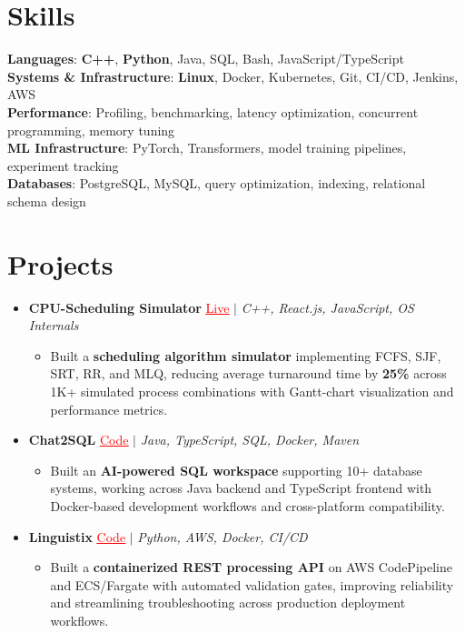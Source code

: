 \documentclass[letterpaper,10pt]{article}
\newcommand{\resumeItem}[1]{\item\small{{#1 \vspace{-2pt}}}}
\newcommand{\resumeProjectHeading}[1]{\item \small #1 \vspace{-2pt}}
\newcommand{\resumeSubHeadingListStart}{\begin{itemize}[leftmargin=0.0in, label={}]}
\newcommand{\resumeSubHeadingListEnd}{\end{itemize}}
\newcommand{\resumeProjItemListStart}{\begin{itemize}[leftmargin=0.15in,label=\textbullet,itemsep=0pt,topsep=0pt,parsep=0pt,partopsep=0pt]}
\newcommand{\resumeProjItemListEnd}{\end{itemize}\vspace{-4pt}}
\begin{document}
\section{Skills}
\begin{itemize}[leftmargin=0.15in, label={}]
\small{\item{
\textbf{Languages}: \textbf{C++}, \textbf{Python}, Java, SQL, Bash, JavaScript/TypeScript \\
\textbf{Systems \& Infrastructure}: \textbf{Linux}, Docker, Kubernetes, Git, CI/CD, Jenkins, AWS \\
\textbf{Performance}: Profiling, benchmarking, latency optimization, concurrent programming, memory tuning \\
\textbf{ML Infrastructure}: PyTorch, Transformers, model training pipelines, experiment tracking \\
\textbf{Databases}: PostgreSQL, MySQL, query optimization, indexing, relational schema design
}}
\end{itemize}
\vspace{-16pt}
\section{Projects}
\resumeSubHeadingListStart
\vspace{-2pt}
\resumeProjectHeading{\textbf{CPU-Scheduling Simulator} {\href{https://cpu-scheduler-amber.vercel.app/}{\textcolor{red}{\underline{Live}}}} $|$ \emph{C++, React.js, JavaScript, OS Internals}}
\resumeProjItemListStart
\resumeItem{Built a \textbf{scheduling algorithm simulator} implementing FCFS, SJF, SRT, RR, and MLQ, reducing average turnaround time by \textbf{25\%} across 1K+ simulated process combinations with Gantt-chart visualization and performance metrics.}
\resumeProjItemListEnd
\vspace{3pt}
\resumeProjectHeading{\textbf{Chat2SQL} {\href{https://github.com/SAHAJ-BHADJA/Chat2SQL}{\textcolor{red}{\underline{Code}}}} $|$ \emph{Java, TypeScript, SQL, Docker, Maven}}
\resumeProjItemListStart
\resumeItem{Built an \textbf{AI-powered SQL workspace} supporting 10+ database systems, working across Java backend and TypeScript frontend with Docker-based development workflows and cross-platform compatibility.}
\resumeProjItemListEnd
\vspace{3pt}
\resumeProjectHeading{\textbf{Linguistix} {\href{https://github.com/SAHAJ-BHADJA/Linguistix}{\textcolor{red}{\underline{Code}}}} $|$ \emph{Python, AWS, Docker, CI/CD}}
\resumeProjItemListStart
\resumeItem{Built a \textbf{containerized REST processing API} on AWS CodePipeline and ECS/Fargate with automated validation gates, improving reliability and streamlining troubleshooting across production deployment workflows.}
\resumeProjItemListEnd
\resumeSubHeadingListEnd
\end{document}
